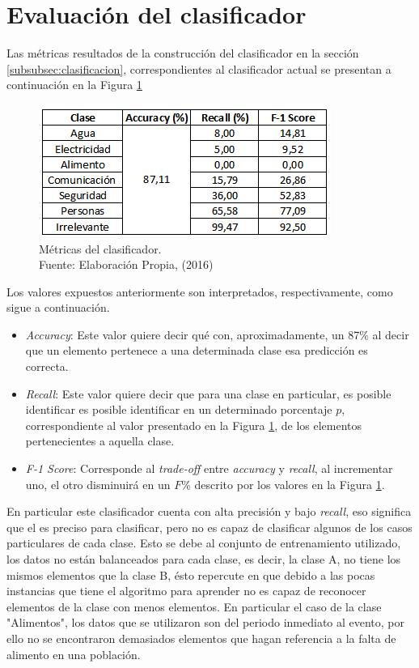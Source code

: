 \section{Evaluación del clasificador}
\label{sec:EvalClassificador}

Las métricas resultados de la construcción del clasificador en la sección \ref{subsubsec:clasificacion}, correspondientes al clasificador actual se presentan a continuación en la Figura \ref{fig:metricasClass} 
\begin{figure}[H]
        \centering
        \captionsetup{justification=centering}
        \includegraphics[scale=0.8]{images/MetricasClasificador.png}
        \caption[Métricas del clasificador.]{Métricas del clasificador.\\Fuente: Elaboración Propia, (2016)}
        \label{fig:metricasClass}
\end{figure}

Los valores expuestos anteriormente son interpretados, respectivamente, como sigue a continuación.

\begin{itemize}
\item \textit{Accuracy}: Este valor quiere decir qué con, aproximadamente, un 87\% al decir que un elemento pertenece a una determinada clase esa predicción es correcta.
\item \textit{Recall}: Este valor quiere decir que para una clase en particular, es posible identificar es posible identificar en un determinado porcentaje $p$, correspondiente al valor presentado en la Figura \ref{fig:metricasClass}, de los elementos pertenecientes a aquella clase.
\item \textit{F-1 Score}: Corresponde al \textit{trade-off} entre \textit{accuracy} y \textit{recall}, al incrementar uno, el otro disminuirá en un $F$\% descrito por los valores en la Figura \ref{fig:metricasClass}.
\end{itemize}

En particular este clasificador cuenta con alta precisión y bajo \textit{recall}, eso significa que el es preciso para clasificar, pero no es capaz de clasificar algunos de los casos particulares de cada clase. Esto se debe al conjunto de entrenamiento utilizado, los datos no están balanceados para cada clase, es decir, la clase A, no tiene los mismos elementos que la clase B, ésto repercute en que debido a las pocas instancias que tiene el algoritmo para aprender no es capaz de reconocer elementos de la clase con menos elementos. En particular el caso de la clase "Alimentos", los datos que se utilizaron son del periodo inmediato al evento, por ello no se encontraron demasiados elementos que hagan referencia a la falta de alimento en una población.

